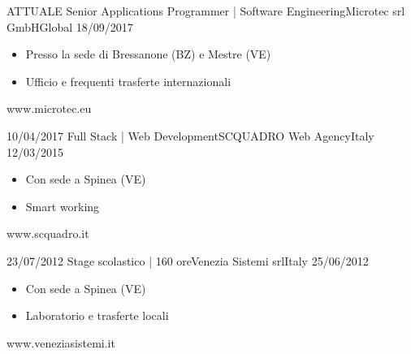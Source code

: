 
\begin{experiences}
    \experience
    {ATTUALE} {Senior Applications Programmer | Software Engineering}{Microtec srl GmbH}{Global}
    {18/09/2017} {
        \begin{itemize}
            \item Presso la sede di Bressanone (BZ) e Mestre (VE)
            \item Ufficio e frequenti trasferte internazionali\\
        \end{itemize}
    }
    {www.microtec.eu}
    \emptySeparator

    \experience
    {10/04/2017} {Full Stack | Web Development}{SCQUADRO Web Agency}{Italy}
    {12/03/2015} {
        \begin{itemize}
            \item Con sede a Spinea (VE)
            \item Smart working\\
        \end{itemize}
    }
    {www.scquadro.it}
    \emptySeparator

    \experience
    {23/07/2012} {Stage scolastico | 160 ore}{Venezia Sistemi srl}{Italy}
    {25/06/2012} {
        \begin{itemize}
            \item Con sede a Spinea (VE)
            \item Laboratorio e trasferte locali\\
        \end{itemize}
    }
    {www.veneziasistemi.it}
\end{experiences}
